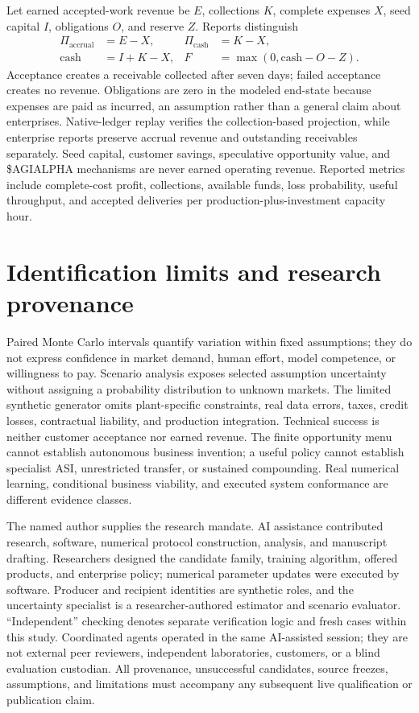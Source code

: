 Let earned accepted-work revenue be $E$, collections $K$, complete expenses $X$, seed capital $I$, obligations $O$, and reserve $Z$. Reports distinguish
\begin{align}
 \Pi_{\mathrm{accrual}}&=E-X,&\Pi_{\mathrm{cash}}&=K-X,\\
 \mathrm{cash}&=I+K-X,&F&=\max(0,\mathrm{cash}-O-Z).
\end{align}
Acceptance creates a receivable collected after seven days; failed acceptance creates no revenue. Obligations are zero in the modeled end-state because expenses are paid as incurred, an assumption rather than a general claim about enterprises. Native-ledger replay verifies the collection-based projection, while enterprise reports preserve accrual revenue and outstanding receivables separately. Seed capital, customer savings, speculative opportunity value, and \$AGIALPHA mechanisms are never earned operating revenue. Reported metrics include complete-cost profit, collections, available funds, loss probability, useful throughput, and accepted deliveries per production-plus-investment capacity hour.

\section{Identification limits and research provenance}
\label{sec:methods-limits}

Paired Monte Carlo intervals quantify variation within fixed assumptions; they do not express confidence in market demand, human effort, model competence, or willingness to pay. Scenario analysis exposes selected assumption uncertainty without assigning a probability distribution to unknown markets. The limited synthetic generator omits plant-specific constraints, real data errors, taxes, credit losses, contractual liability, and production integration. Technical success is neither customer acceptance nor earned revenue. The finite opportunity menu cannot establish autonomous business invention; a useful policy cannot establish specialist ASI, unrestricted transfer, or sustained compounding. Real numerical learning, conditional business viability, and executed system conformance are different evidence classes.

The named author supplies the research mandate. AI assistance contributed research, software, numerical protocol construction, analysis, and manuscript drafting. Researchers designed the candidate family, training algorithm, offered products, and enterprise policy; numerical parameter updates were executed by software. Producer and recipient identities are synthetic roles, and the uncertainty specialist is a researcher-authored estimator and scenario evaluator. ``Independent'' checking denotes separate verification logic and fresh cases within this study. Coordinated agents operated in the same AI-assisted session; they are not external peer reviewers, independent laboratories, customers, or a blind evaluation custodian. All provenance, unsuccessful candidates, source freezes, assumptions, and limitations must accompany any subsequent live qualification or publication claim.
